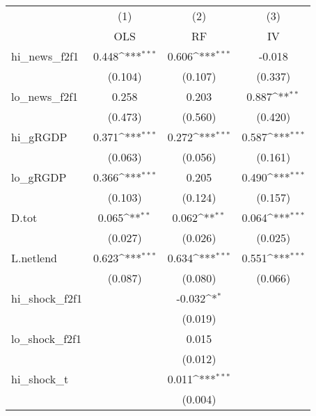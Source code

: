 {
\def\sym#1{\ifmmode^{#1}\else\(^{#1}\)\fi}
\begin{tabular}{l*{3}{c}}
\toprule
            &\multicolumn{1}{c}{(1)}&\multicolumn{1}{c}{(2)}&\multicolumn{1}{c}{(3)}\\
            &\multicolumn{1}{c}{OLS}&\multicolumn{1}{c}{RF}&\multicolumn{1}{c}{IV}\\
\midrule
hi\_news\_f2f1&       0.448\sym{***}&       0.606\sym{***}&      -0.018         \\
            &     (0.104)         &     (0.107)         &     (0.337)         \\
\addlinespace
lo\_news\_f2f1&       0.258         &       0.203         &       0.887\sym{**} \\
            &     (0.473)         &     (0.560)         &     (0.420)         \\
\addlinespace
hi\_gRGDP    &       0.371\sym{***}&       0.272\sym{***}&       0.587\sym{***}\\
            &     (0.063)         &     (0.056)         &     (0.161)         \\
\addlinespace
lo\_gRGDP    &       0.366\sym{***}&       0.205         &       0.490\sym{***}\\
            &     (0.103)         &     (0.124)         &     (0.157)         \\
\addlinespace
D.tot       &       0.065\sym{**} &       0.062\sym{**} &       0.064\sym{***}\\
            &     (0.027)         &     (0.026)         &     (0.025)         \\
\addlinespace
L.netlend   &       0.623\sym{***}&       0.634\sym{***}&       0.551\sym{***}\\
            &     (0.087)         &     (0.080)         &     (0.066)         \\
\addlinespace
hi\_shock\_f2f1&                     &      -0.032\sym{*}  &                     \\
            &                     &     (0.019)         &                     \\
\addlinespace
lo\_shock\_f2f1&                     &       0.015         &                     \\
            &                     &     (0.012)         &                     \\
\addlinespace
hi\_shock\_t  &                     &       0.011\sym{***}&                     \\
            &                     &     (0.004)         &                     \\

\end{tabular}}
